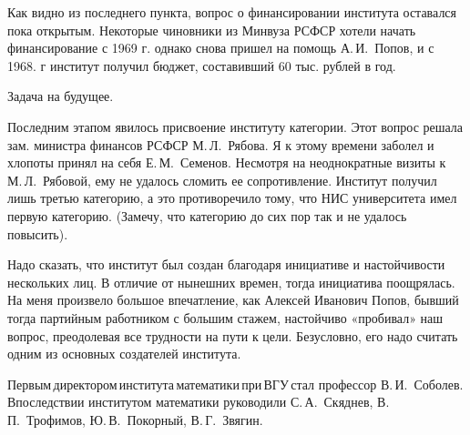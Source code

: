 Как видно из последнего пункта, вопрос о финансировании института оставался пока открытым. Некоторые чиновники из Минвуза РСФСР хотели начать финансирование с 1969 г. однако снова пришел на помощь А.\,И.~Попов, и с 1968. г институт получил бюджет, составивший 60 тыс. рублей в год.

Задача  на  будущее.

Последним этапом явилось присвоение институту категории. Этот вопрос решала зам. министра финансов РСФСР М.\,Л.~Рябова. Я к этому времени заболел и хлопоты принял на себя Е.\,М.~Семенов. Несмотря на неоднократные визиты к М.\,Л.~Рябовой, ему не удалось сломить ее сопротивление. Институт получил лишь третью категорию, а это противоречило тому, что НИС университета имел первую категорию. (Замечу, что категорию до сих пор так и не удалось повысить).

Надо сказать, что институт был создан благодаря инициативе и настойчивости нескольких лиц. В отличие от нынешних времен, тогда инициатива поощрялась. На меня \linebreak произвело большое впечатление, как Алексей Иванович Попов, бывший тогда партийным работником с большим стажем, настойчиво «пробивал» наш вопрос, преодолевая все трудности на пути к цели. Безусловно, его надо считать одним из основных создателей института.

Первым\,директором\,института\,математики\,при\,ВГУ\,стал \linebreak профессор В.\,И.~Соболев. Впоследствии институтом математики руководили С.\,А.~Скяднев, В.\,П.~Трофимов, Ю.\,В.~Покорный, В.\,Г.~Звягин.
